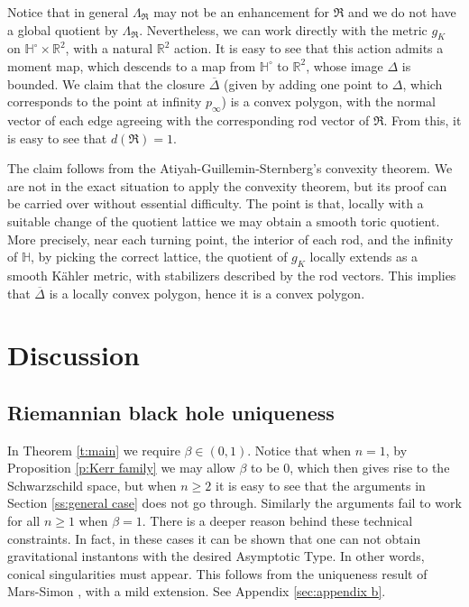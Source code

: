 \documentclass[a4paper,11pt]{amsart}
\theoremstyle{definition}
\numberwithin{equation}{section}
\newcommand{\dH}{\mathbb{H}}
\newcommand{\R}{\mathbb{R}}
\newcommand{\mR} {\mathfrak R}
\begin{document}
Notice that in general $\Lambda_{\mR}$ may not be an enhancement for $\mR$ and we do not have a global quotient by $\Lambda_{\mR}$. Nevertheless, we can work directly with the metric $g_K$ on $\dH^\circ\times \R^2$, with a natural $\R^2$ action. It is easy to see that this action admits a moment map, which descends to a map from $\mathbb{H}^\circ$ to $\mathbb{R}^2$, whose image $ \Delta$ is bounded. We claim that the closure $\overline{\Delta}$ (given by adding one point to $\Delta$, which corresponds to the point at infinity $p_\infty$) is a convex polygon, with the normal vector of each edge agreeing with the corresponding rod vector of $\mR$. From this, it is easy to see that $d(\mR)=1$.  
  
The claim follows from the Atiyah-Guillemin-Sternberg's convexity theorem. We are not in the exact situation to apply the convexity theorem, but its proof can be carried over without essential difficulty. The point is that, locally with a suitable change of the quotient lattice  we may obtain a smooth toric quotient. More precisely, near each turning point, the interior of each rod, and the infinity of $\mathbb{H}$, by picking the correct lattice, the quotient of $g_K$ locally extends as a smooth K\"ahler metric, with stabilizers described by the rod vectors. This implies that $\overline\Delta$ is a locally convex polygon, hence it is a convex polygon. 
  
  
  



\section{Discussion}\label{sec:discussion}
\subsection{Riemannian black hole uniqueness}


In Theorem \ref{t:main} we require $\beta\in (0, 1)$. Notice that when $n=1$, by Proposition \ref{p:Kerr family} we may allow $\beta$ to be $0$, which then gives rise to the Schwarzschild space, but when $n\geq 2$ it is easy to see that the arguments in Section \ref{ss:general case} does not go through. Similarly the arguments fail to work for all $n\geq 1$ when $\beta=1$. There is a deeper reason behind these technical constraints.
In fact, in these cases it can be shown that one can not obtain gravitational instantons with the desired Asymptotic Type. In other words, conical singularities must appear.  This follows from the uniqueness result of Mars-Simon \cite{MarsSimon}, with a mild extension. See Appendix \ref{sec:appendix b}.
\end{document}
